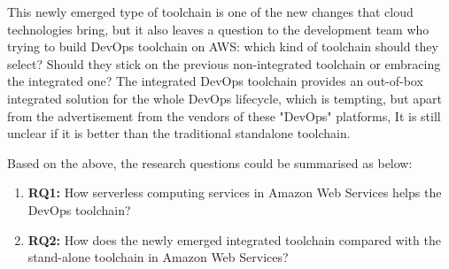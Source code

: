 \par
This newly emerged type of toolchain is one of the new changes that cloud technologies bring, but it also leaves a question to the development team who trying to build DevOps toolchain on AWS: which kind of toolchain should they select? Should they stick on the previous non-integrated toolchain or embracing the integrated one? The integrated DevOps toolchain provides an out-of-box integrated solution for the whole DevOps lifecycle, which is tempting, but apart from the advertisement from the vendors of these "DevOps" platforms, It is still unclear if it is better than the traditional standalone toolchain. 
\par
Based on the above, the research questions could be summarised as below:
\begin{enumerate}
    \item \textbf{RQ1:} How serverless computing services in Amazon Web Services helps the DevOps toolchain?
    \item \textbf{RQ2:} How does the newly emerged integrated toolchain compared with the stand-alone toolchain in Amazon Web Services?
\end{enumerate}
